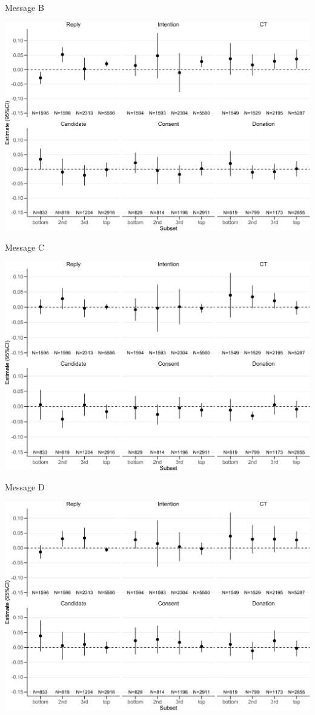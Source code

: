 \documentclass[
      aspectratio=169,
        12pt,
    ]{beamer}
\begin{document}
\begin{frame}{Message B}
\protect\hypertarget{message-b-1}{}
\begin{center}\includegraphics[width=0.75\linewidth]{report_files/figure-beamer/plotB-geographical-hetero-primaries-1} \end{center}
\end{frame}

\begin{frame}{Message C}
\protect\hypertarget{message-c-1}{}
\begin{center}\includegraphics[width=0.75\linewidth]{report_files/figure-beamer/plotC-geographical-hetero-primaries-1} \end{center}
\end{frame}

\begin{frame}{Message D}
\protect\hypertarget{message-d-1}{}
\begin{center}\includegraphics[width=0.75\linewidth]{report_files/figure-beamer/plotD-geographical-hetero-primaries-1} \end{center}
\end{frame}
\end{document}
